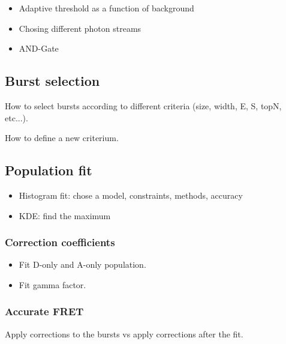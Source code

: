 \begin{itemize}
\item Adaptive threshold as a function of background
\item Chosing different photon streams
\item AND-Gate
\end{itemize}

\subsection{Burst selection}

How to select bursts according to different criteria (size, width, E, S, topN, etc...).

How to define a new criterium.


\subsection{Population fit}

\begin{itemize}
\item Histogram fit: chose a model, constraints, methods, accuracy
\item KDE: find the maximum
\end{itemize}

\subsubsection{Correction coefficients}

\begin{itemize}
\item Fit D-only and A-only population.
\item Fit gamma factor.
\end{itemize}


\subsubsection{Accurate FRET}

Apply corrections to the bursts vs apply corrections after the fit.

